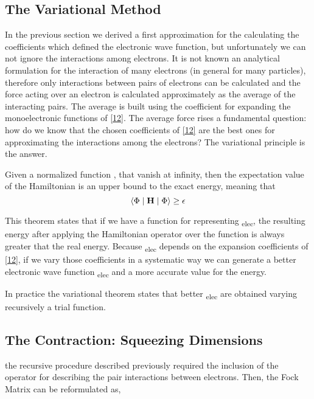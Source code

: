 \documentclass{tmr}
\begin{document}
\subsection{The Variational Method}

In the previous section we derived a first approximation for the calculating the coefficients
which defined the electronic wave function, but unfortunately we can not ignore the interactions 
among electrons. It is not known an analytical formulation for the interaction
of many electrons (in general for many particles), therefore only 
interactions between pairs of electrons can be calculated and the
force acting over an electron is calculated approximately as
the average of the interacting pairs. The average is built using the coefficient
for expanding the monoelectronic functions of \eqref{12}. The average force
rises a fundamental question: how do we know that the chosen coefficients of \eqref{12}
are the best ones for approximating the interactions among the electrons? The variational
principle is the answer.

\begin{theorem}
Given a normalized function \textPhi, that vanish at infinity, then the expectation value 
of the Hamiltonian is an upper bound to the exact energy, meaning that
\[ \braket{\Phi \mid \mathbf{H} \mid \Phi} \geq \epsilon \] 
\end{theorem}

This theorem states that if we have a function for representing \textPhi\textsubscript{elec},
the resulting energy after applying the Hamiltonian operator over the function is always greater
that the real energy. Because  \textPhi\textsubscript{elec} depends on the expansion coefficients of
\eqref{12}, if we vary those coefficients in a systematic way we can generate 
a better electronic wave function \textPhi\textsubscript{elec} and a more accurate value
for the energy.

In practice the variational theorem states that better \textPhi\textsubscript{elec} are
obtained varying recursively a trial function.

\subsection{The Contraction: Squeezing Dimensions}

the recursive procedure described previously required the inclusion of the operator
for describing the pair interactions between electrons. Then, the Fock Matrix can
be reformulated as,
\end{document}
